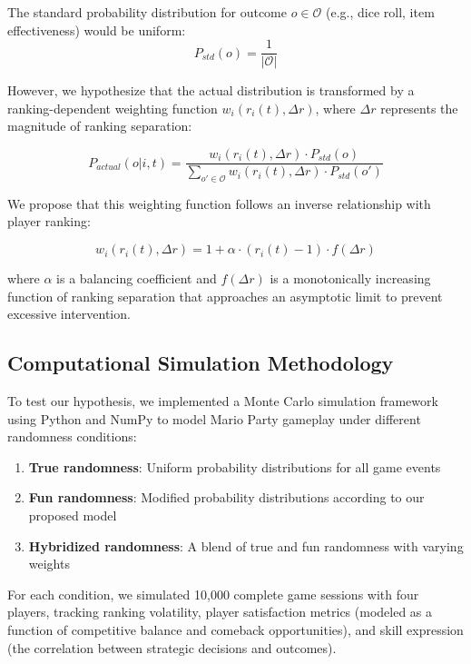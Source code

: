 \documentclass{article}
\begin{document}
The standard probability distribution for outcome $o \in \mathcal{O}$ (e.g., dice roll, item effectiveness) would be uniform:
\begin{equation}
P_{std}(o) = \frac{1}{|\mathcal{O}|}
\end{equation}

However, we hypothesize that the actual distribution is transformed by a ranking-dependent weighting function $w_i(r_i(t), \Delta r)$, where $\Delta r$ represents the magnitude of ranking separation:

\begin{equation}
P_{actual}(o|i,t) = \frac{w_i(r_i(t), \Delta r) \cdot P_{std}(o)}{\sum_{o' \in \mathcal{O}} w_i(r_i(t), \Delta r) \cdot P_{std}(o')}
\end{equation}

We propose that this weighting function follows an inverse relationship with player ranking:

\begin{equation}
w_i(r_i(t), \Delta r) = 1 + \alpha \cdot (r_i(t) - 1) \cdot f(\Delta r)
\end{equation}

where $\alpha$ is a balancing coefficient and $f(\Delta r)$ is a monotonically increasing function of ranking separation that approaches an asymptotic limit to prevent excessive intervention.

\subsection{Computational Simulation Methodology}

To test our hypothesis, we implemented a Monte Carlo simulation framework using Python and NumPy to model Mario Party gameplay under different randomness conditions:

\begin{enumerate}
    \item \textbf{True randomness}: Uniform probability distributions for all game events
    \item \textbf{Fun randomness}: Modified probability distributions according to our proposed model
    \item \textbf{Hybridized randomness}: A blend of true and fun randomness with varying weights
\end{enumerate}

For each condition, we simulated 10,000 complete game sessions with four players, tracking ranking volatility, player satisfaction metrics (modeled as a function of competitive balance and comeback opportunities), and skill expression (the correlation between strategic decisions and outcomes).
\end{document}
